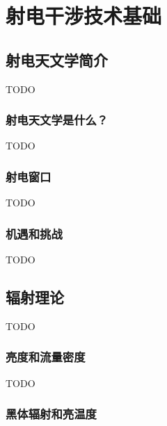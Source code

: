 
\chapter{射电干涉技术基础}
\label{chap:interferometry}

\section{射电天文学简介}
\label{sec:radio-astronomy}

TODO

\subsection{射电天文学是什么？}

TODO

\subsection{射电窗口}

TODO

\subsection{机遇和挑战}

TODO


\section{辐射理论}
\label{sec:radiation}

TODO

\subsection{亮度和流量密度}

TODO

\subsection{黑体辐射和亮温度}

